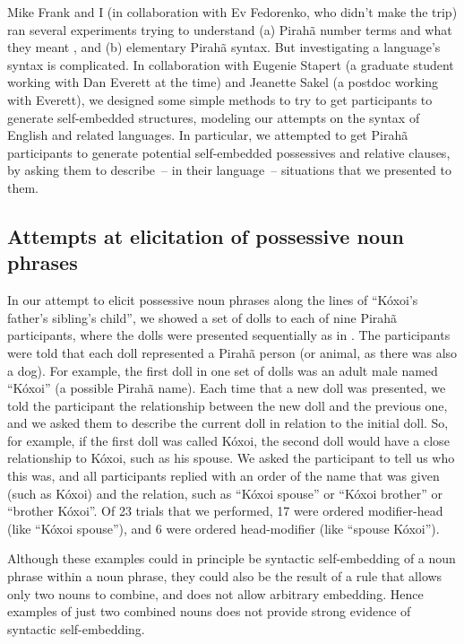 \documentclass[output=paper]{langscibook}
\begin{document}
Mike Frank and I (in collaboration with Ev Fedorenko, who didn’t make the trip) ran several experiments trying to understand (a) Pirahã number terms and what they meant \citep{frank2008language}, and (b) elementary Pirahã syntax. But investigating a language’s syntax is complicated.  In collaboration with Eugenie Stapert (a graduate student working with Dan Everett at the time) and Jeanette Sakel (a postdoc working with Everett), we designed some simple methods to try to get participants to generate self-embedded structures, modeling our attempts on the syntax of English and related languages. In particular, we attempted to get Pirahã participants to generate potential self-embedded possessives and relative clauses, by asking them to describe~-- in their language~-- situations that we presented to them.

\subsection{Attempts at elicitation of possessive noun phrases}

In our attempt to elicit possessive noun phrases along the lines of ``Kóxoi’s father’s sibling’s child'', we showed a set of dolls to each of nine Pirahã participants, where the dolls were presented sequentially as in . The participants were told that each doll represented a Pirahã person (or animal, as there was also a dog). For example, the first doll in one set of dolls was an adult male named ``Kóxoi'' (a possible Pirahã name). Each time that a new doll was presented, we told the participant the relationship between the new doll and the previous one, and we asked them to describe the current doll in relation to the initial doll.  So, for example, if the first doll was called Kóxoi, the second doll would have a close relationship to Kóxoi, such as his spouse. We asked the participant to tell us who this was, and all participants  replied with an order of the name that was given (such as Kóxoi) and the relation, such as ``Kóxoi spouse'' or ``Kóxoi brother'' or ``brother Kóxoi''. Of 23 trials that we performed, 17 were ordered modifier-head (like ``Kóxoi spouse''), and 6 were ordered head-modifier (like ``spouse Kóxoi'').

Although these examples could in principle be syntactic self-embedding of a noun phrase within a noun phrase, they could also be the result of a rule that allows only two nouns to combine, and does not allow arbitrary embedding.  Hence examples of just two combined nouns does not provide strong evidence of syntactic self-embedding.
\end{document}
